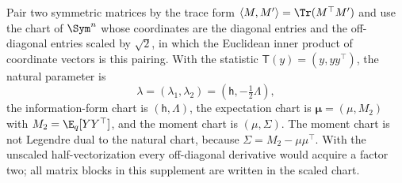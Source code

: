 Pair two symmetric matrices by the trace form \(\langle M,M'\rangle=\Tr(M^\top M')\) and use the
chart of \(\Sym^n\) whose coordinates are the diagonal entries and the
off-diagonal entries scaled by \(\sqrt2\), in which the Euclidean inner product
of coordinate vectors is this pairing. With the statistic
\(\mathsf T(y)=(y,yy^\top)\), the natural parameter is
\begin{equation}
\lambda=(\lambda_1,\lambda_2)=\left(\mathsf h,-\tfrac12\Lambda\right),
\label{eq:ig-natural}
\end{equation}
the information-form chart is \((\mathsf h,\Lambda)\), the expectation chart
is \(\boldsymbol\mu=(\mu,M_2)\) with \(M_2=\E_q[YY^\top]\), and the moment
chart is \((\mu,\Sigma)\). The moment chart is not Legendre dual to the
natural chart, because \(\Sigma=M_2-\mu\mu^\top\). With the unscaled
half-vectorization every off-diagonal derivative would acquire a factor two;
all matrix blocks in this supplement are written in the scaled chart.

